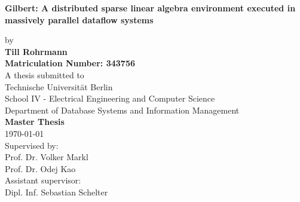 \begin{titlepage}
	\strut
	\hfill
	\begin{center}
	\vspace{1cm}
	\Huge
	\begin{spacing}{.9}
		\textcolor{TURedFront}{\textbf{Gilbert: A distributed sparse linear algebra environment executed in massively parallel dataflow systems}}\\
	\end{spacing}
	\vspace{0.8cm}
	\large
	by\\
	\vspace{0.8cm} 
	\textbf{Till Rohrmann}\\
	\vspace{0.8cm} 
	\textbf{Matriculation Number: 343756}\\
	\vspace{2cm} 
 	A thesis submitted to\\
	\vspace{0.5cm}
	Technische Universität Berlin\\
	School IV - Electrical Engineering and Computer Science\\
	Department of Database Systems and Information Management\\
	\vspace{0.5cm}
	\textbf{Master Thesis}\\
	\vspace{2.2cm}
	\today\\
	\vspace{2.0cm}
	\large
	Supervised by:\\
	Prof. Dr. Volker Markl\\
	Prof. Dr. Odej Kao\\
	\vspace{1cm}
	Assistant supervisor:\\
	Dipl. Inf. Sebastian Schelter
	\end{center}
\end{titlepage}